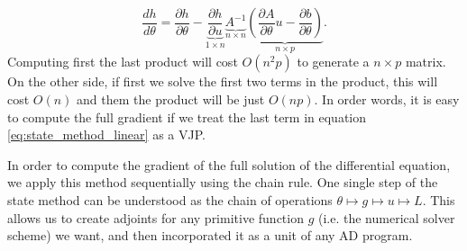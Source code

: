 \begin{equation}
    \frac{dh}{d\theta} = \frac{\partial h}{\partial \theta} - 
    \underbrace{\frac{\partial h}{\partial u}}_{1 \times n}
    \underbrace{A^{-1}}_{n \times n} 
    \underbrace{\left( \frac{\partial A }{\partial \theta} u - \frac{\partial b}{\partial \theta} \right)}_{n \times p}.
    \label{eq:state_method_linear}
\end{equation}
Computing first the last product will cost $O(n^2p)$ to generate a $n \times p$ matrix. On the other side, if first we solve the first two terms in the product, this will cost $O(n)$ and them the product will be just $O(np)$. In order words, it is easy to compute the full gradient if we treat the last term in equation \eqref{eq:state_method_linear} as a VJP. 

In order to compute the gradient of the full solution of the differential equation, we apply this method sequentially using the chain rule. One single step of the state method can be understood as the chain of operations $\theta \mapsto g \mapsto u \mapsto L$. This allows us to create adjoints for any primitive function $g$ (i.e. the numerical solver scheme) we want, and then incorporated it as a unit of any AD program. 